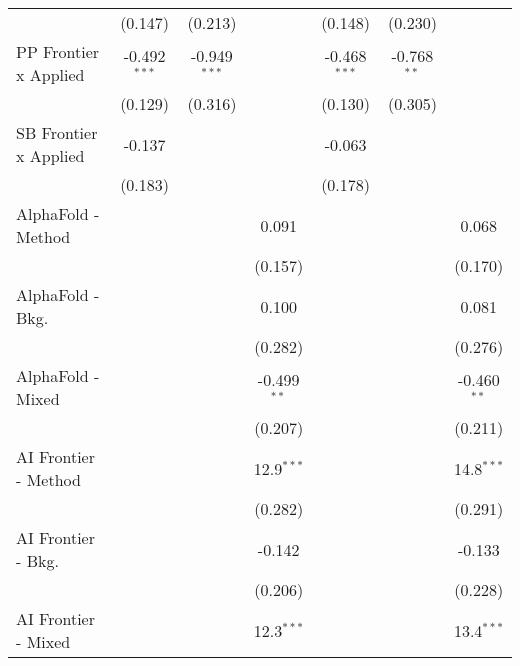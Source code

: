 \begin{tabular}{lcccccc}
                                  & (0.147)        & (0.213)        &               & (0.148)        & (0.230)        &   \\   
   PP Frontier x Applied          & -0.492$^{***}$ & -0.949$^{***}$ &               & -0.468$^{***}$ & -0.768$^{**}$  &   \\   
                                  & (0.129)        & (0.316)        &               & (0.130)        & (0.305)        &   \\   
   SB Frontier x Applied          & -0.137         &                &               & -0.063         &                &   \\   
                                  & (0.183)        &                &               & (0.178)        &                &   \\   
   AlphaFold - Method             &                &                & 0.091         &                &                & 0.068\\   
                                  &                &                & (0.157)       &                &                & (0.170)\\   
   AlphaFold - Bkg.               &                &                & 0.100         &                &                & 0.081\\   
                                  &                &                & (0.282)       &                &                & (0.276)\\   
   AlphaFold - Mixed              &                &                & -0.499$^{**}$ &                &                & -0.460$^{**}$\\   
                                  &                &                & (0.207)       &                &                & (0.211)\\   
   AI Frontier - Method           &                &                & 12.9$^{***}$  &                &                & 14.8$^{***}$\\   
                                  &                &                & (0.282)       &                &                & (0.291)\\   
   AI Frontier - Bkg.             &                &                & -0.142        &                &                & -0.133\\   
                                  &                &                & (0.206)       &                &                & (0.228)\\   
   AI Frontier - Mixed            &                &                & 12.3$^{***}$  &                &                & 13.4$^{***}$\\   

\end{tabular}
